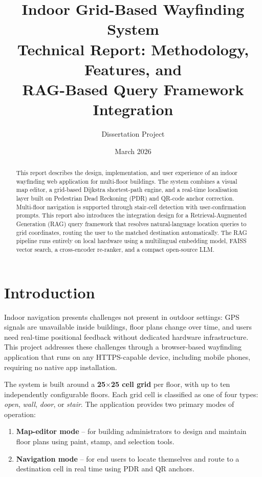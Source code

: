 \documentclass[12pt,a4paper]{article}
\title{\textbf{Indoor Grid-Based Wayfinding System}\\[4pt]
       \large Technical Report: Methodology, Features, and\\
       RAG-Based Query Framework Integration}
\author{Dissertation Project}
\date{March 2026}
\begin{document}
\maketitle
\tableofcontents
\newpage

\begin{abstract}
\noindent
This report describes the design, implementation, and user experience of an
indoor wayfinding web application for multi-floor buildings. The system combines
a visual map editor, a grid-based Dijkstra shortest-path engine, and a real-time
localisation layer built on Pedestrian Dead Reckoning (PDR) and QR-code anchor
correction. Multi-floor navigation is supported through stair-cell detection
with user-confirmation prompts. This report also introduces the integration
design for a Retrieval-Augmented Generation (RAG) query framework that resolves
natural-language location queries to grid coordinates, routing the user to the
matched destination automatically. The RAG pipeline runs entirely on local
hardware using a multilingual embedding model, FAISS vector search, a
cross-encoder re-ranker, and a compact open-source LLM.
\end{abstract}

\section{Introduction}
\label{sec:intro}

Indoor navigation presents challenges not present in outdoor settings: GPS
signals are unavailable inside buildings, floor plans change over time, and
users need real-time positional feedback without dedicated hardware
infrastructure. This project addresses these challenges through a browser-based
wayfinding application that runs on any HTTPS-capable device, including mobile
phones, requiring no native app installation.

The system is built around a \textbf{25$\times$25 cell grid} per floor, with up
to ten independently configurable floors. Each grid cell is classified as one of
four types: \emph{open}, \emph{wall}, \emph{door}, or \emph{stair}. The
application provides two primary modes of operation:

\begin{enumerate}[noitemsep]
  \item \textbf{Map-editor mode} -- for building administrators to design and
    maintain floor plans using paint, stamp, and selection tools.
  \item \textbf{Navigation mode} -- for end users to locate themselves and
    route to a destination cell in real time using PDR and QR anchors.
\end{enumerate}
\end{document}
